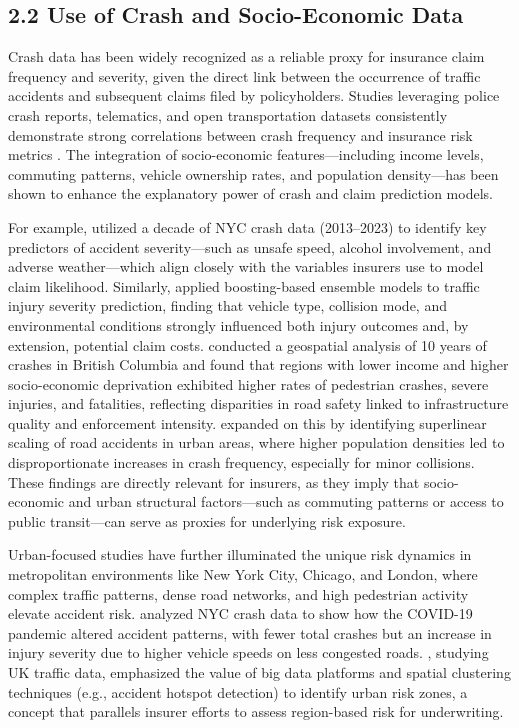 \documentclass[
  number,
  review,
  3p]{elsarticle}
\begin{document}
\subsection{\texorpdfstring{\textbf{2.2 Use of Crash and Socio-Economic
Data}}{2.2 Use of Crash and Socio-Economic Data}}\label{use-of-crash-and-socio-economic-data}

Crash data has been widely recognized as a reliable proxy for insurance
claim frequency and severity, given the direct link between the
occurrence of traffic accidents and subsequent claims filed by
policyholders. Studies leveraging police crash reports, telematics, and
open transportation datasets consistently demonstrate strong
correlations between crash frequency and insurance risk metrics
\citep{takale}. The integration of socio-economic features---including
income levels, commuting patterns, vehicle ownership rates, and
population density---has been shown to enhance the explanatory power of
crash and claim prediction models.

For example, \citet{adeniyi} utilized a decade of NYC crash data
(2013--2023) to identify key predictors of accident severity---such as
unsafe speed, alcohol involvement, and adverse weather---which align
closely with the variables insurers use to model claim likelihood.
Similarly, \citet{dong} applied boosting-based ensemble models to
traffic injury severity prediction, finding that vehicle type, collision
mode, and environmental conditions strongly influenced both injury
outcomes and, by extension, potential claim costs. \citet{brubacher}
conducted a geospatial analysis of 10 years of crashes in British
Columbia and found that regions with lower income and higher
socio-economic deprivation exhibited higher rates of pedestrian crashes,
severe injuries, and fatalities, reflecting disparities in road safety
linked to infrastructure quality and enforcement intensity.
\citet{cabrera} expanded on this by identifying superlinear scaling of
road accidents in urban areas, where higher population densities led to
disproportionate increases in crash frequency, especially for minor
collisions. These findings are directly relevant for insurers, as they
imply that socio-economic and urban structural factors---such as
commuting patterns or access to public transit---can serve as proxies
for underlying risk exposure.

Urban-focused studies have further illuminated the unique risk dynamics
in metropolitan environments like New York City, Chicago, and London,
where complex traffic patterns, dense road networks, and high pedestrian
activity elevate accident risk. \citet{adeniyi} analyzed NYC crash data
to show how the COVID-19 pandemic altered accident patterns, with fewer
total crashes but an increase in injury severity due to higher vehicle
speeds on less congested roads. \citet{feng}, studying UK traffic data,
emphasized the value of big data platforms and spatial clustering
techniques (e.g., accident hotspot detection) to identify urban risk
zones, a concept that parallels insurer efforts to assess region-based
risk for underwriting.
\end{document}
